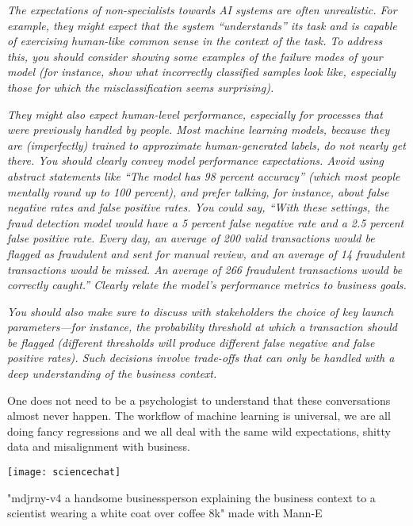 \textit{The expectations of non-specialists towards AI systems are often unrealistic. For example, they might expect that the system “understands” its task and is capable of exercising human-like common sense in the context of the task. To address this, you should consider showing some examples of the failure modes of your model (for instance, show what incorrectly classified samples look like, especially those for which the misclassification seems surprising).} 

\textit{They might also expect human-level performance, especially for processes that were previously handled by people. Most machine learning models, because they are (imperfectly) trained to approximate human-generated labels, do not nearly get there. You should clearly convey model performance expectations. Avoid using abstract statements like “The model has 98 percent accuracy” (which most people mentally round up to 100 percent), and prefer talking, for instance, about false negative rates and false positive rates. You could say, “With these settings, the fraud detection model would have a 5 percent false negative rate and a 2.5 percent false positive rate. Every day, an average of 200 valid transactions would be flagged as fraudulent and sent for manual review, and an average of 14 fraudulent transactions would be missed. An average of 266 fraudulent transactions would be correctly caught.” Clearly relate the model’s performance metrics to business goals.}


\textit{You should also make sure to discuss with stakeholders the choice of key launch parameters—for instance, the probability threshold at which a transaction should be flagged (different thresholds will produce different false negative and false positive rates). Such decisions involve trade-offs that can only be handled with a deep understanding of the business context.}\cite{chollet2022} 

One does not need to be a psychologist to understand that these conversations almost never happen. The workflow of machine learning is universal, we are all doing fancy regressions and we all deal with the same wild expectations, shitty data and misalignment with business.

\begin{marginfigure}[-5.5cm]
        \texttt{[image: sciencechat]}
        \caption{"mdjrny-v4 a handsome businessperson explaining the business context to a scientist wearing a white coat over coffee 8k" made with Mann-E}
\end{marginfigure}

